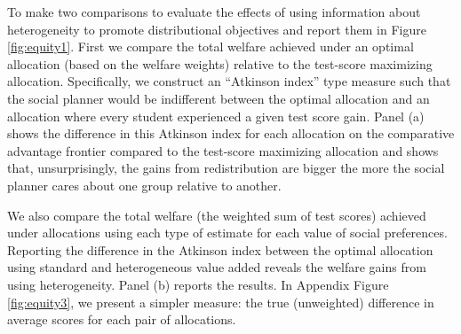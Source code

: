 \documentclass[12pt]{article}
\theoremstyle{definition}
\theoremstyle{definition}
\theoremstyle{definition}
\theoremstyle{definition}
\begin{document}
To make two comparisons to evaluate the effects of using information about heterogeneity to promote distributional objectives and report them in Figure \ref{fig:equity1}. First we compare the total welfare achieved under an optimal allocation (based on the welfare weights) relative to the test-score maximizing allocation. Specifically, we construct an ``Atkinson index'' type measure such that the social planner would be indifferent between the optimal allocation and an allocation where every student experienced a given test score gain. Panel (a) shows the difference in this Atkinson index for each allocation on the comparative advantage frontier compared to the test-score maximizing allocation and shows that, unsurprisingly, the gains from redistribution are bigger the more the social planner cares about one group relative to another. 

We also compare the total welfare (the weighted sum of test scores) achieved under allocations using each type of estimate for each value of social preferences. Reporting the difference in the Atkinson index between the optimal allocation using standard and heterogeneous value added reveals the welfare gains from using heterogeneity. Panel (b) reports the results.  In Appendix Figure \ref{fig:equity3}, we present a simpler measure: the true (unweighted) difference in average scores for each pair of allocations. 
\end{document}
